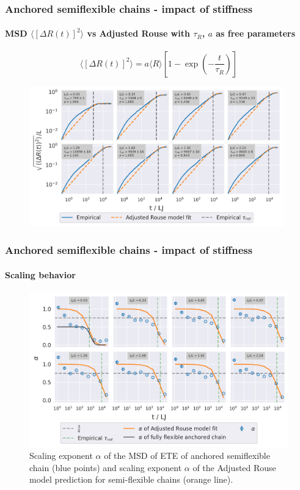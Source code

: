 \documentclass[handout]{beamer}
\newcommand{\mean}[1]{\langle #1 \rangle}
\begin{document}

\begin{frame}
    \frametitle{Anchored semiflexible chains - impact of stiffness}
    \framesubtitle{MSD $\mean{[\Delta R(t)]^2}$ vs Adjusted Rouse with $\tau_R$, $a$ as free parameters}
    $$ \mean{[\Delta R(t)]^2} = a \mean{R} [1 - \exp(-\frac{t}{\tau_R})] $$
    \begin{figure}[h]
        \includegraphics[width=11cm]{4-exp-delta_R-rouse_fit-tau-a_log.png}
    \end{figure}
\end{frame}


\begin{frame}
    \frametitle{Anchored semiflexible chains - impact of stiffness}
    \framesubtitle{Scaling behavior}
    \begin{figure}[h]
        \begin{center}
          \includegraphics[width=\columnwidth,trim={0cm 0cm 0cm 0.0cm},clip]{4-exp-delta_R-rouse_fit-tau-a_alpha.png}
          \caption{\label{fig:alpha_anchored_l_K}
          Scaling exponent $\alpha$ of the MSD of ETE of anchored semiflexible chain (blue points) and 
          scaling exponent $\alpha$ of the Adjusted Rouse model prediction for semi-flexible chains 
          (orange line).
          }
        \end{center}
    \end{figure}
\end{frame}
\end{document}
